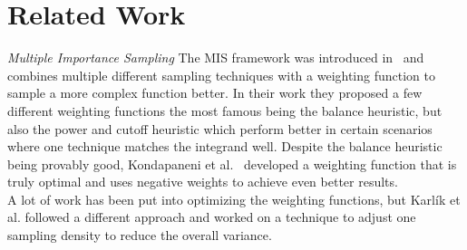 \chapter{Related Work}
\label{ch:related_work}

\textit{Multiple Importance Sampling} The MIS framework was introduced in~\cite{veach_guibas}
and combines multiple different sampling techniques with a weighting function to sample a more complex function better.
In their work they proposed a few different weighting functions the most famous being the balance heuristic,
but also the power and cutoff heuristic which perform better in certain scenarios where one technique matches the integrand well.
Despite the balance heuristic being provably good,
Kondapaneni et al.~\cite{Kondapaneni2019} developed a weighting function that is truly optimal
and uses negative weights to achieve even better results.\\
A lot of work has been put into optimizing the weighting functions,
but Karl\'ik et al. followed a different approach
and worked on a technique to adjust one sampling density to reduce the overall variance.


